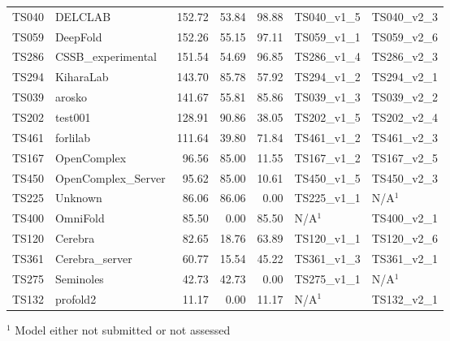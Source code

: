 \begin{table}[ht]
{\begin{tabular}{llrrrll}
TS040 & DELCLAB & 152.72 & 53.84 & 98.88 & TS040\_v1\_5 & TS040\_v2\_3 \\ 
TS059 & DeepFold & 152.26 & 55.15 & 97.11 & TS059\_v1\_1 & TS059\_v2\_6 \\ 
TS286 & CSSB\_experimental & 151.54 & 54.69 & 96.85 & TS286\_v1\_4 & TS286\_v2\_3 \\ 
TS294 & KiharaLab & 143.70 & 85.78 & 57.92 & TS294\_v1\_2 & TS294\_v2\_1 \\ 
TS039 & arosko & 141.67 & 55.81 & 85.86 & TS039\_v1\_3 & TS039\_v2\_2 \\ 
TS202 & test001 & 128.91 & 90.86 & 38.05 & TS202\_v1\_5 & TS202\_v2\_4 \\ 
TS461 & forlilab & 111.64 & 39.80 & 71.84 & TS461\_v1\_2 & TS461\_v2\_3 \\ 
TS167 & OpenComplex & 96.56 & 85.00 & 11.55 & TS167\_v1\_2 & TS167\_v2\_5 \\ 
TS450 & OpenComplex\_Server & 95.62 & 85.00 & 10.61 & TS450\_v1\_5 & TS450\_v2\_3 \\ 
TS225 & Unknown & 86.06 & 86.06 & 0.00 & TS225\_v1\_1 & N/A$^{1}$ \\ 
TS400 & OmniFold & 85.50 & 0.00 & 85.50 & N/A$^{1}$ & TS400\_v2\_1 \\ 
TS120 & Cerebra & 82.65 & 18.76 & 63.89 & TS120\_v1\_1 & TS120\_v2\_6 \\ 
TS361 & Cerebra\_server & 60.77 & 15.54 & 45.22 & TS361\_v1\_3 & TS361\_v2\_1 \\ 
TS275 & Seminoles & 42.73 & 42.73 & 0.00 & TS275\_v1\_1 & N/A$^{1}$ \\ 
TS132 & profold2 & 11.17 & 0.00 & 11.17 & N/A$^{1}$ & TS132\_v2\_1 \\ 
\bottomrule
\end{tabular}%
}
\begin{flushleft}\footnotesize $^{1}$ Model either not submitted or not assessed\end{flushleft}
\end{table}
